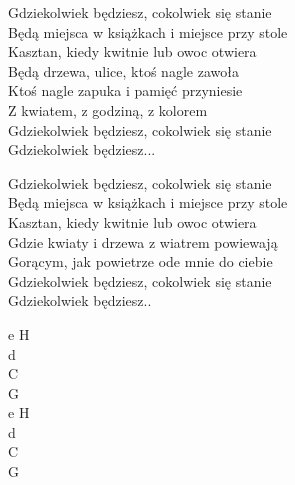 \begin{text}
    Gdziekolwiek będziesz, cokolwiek się stanie\\
    Będą miejsca w książkach i miejsce przy stole\\
    Kasztan, kiedy kwitnie lub owoc otwiera\\
    Będą drzewa, ulice, ktoś nagle zawoła\\
    Ktoś nagle zapuka i pamięć przyniesie\\
    Z kwiatem, z godziną, z kolorem\\
    Gdziekolwiek będziesz, cokolwiek się stanie\\
    Gdziekolwiek będziesz...

    Gdziekolwiek będziesz, cokolwiek się stanie\\
    Będą miejsca w książkach i miejsce przy stole\\
    Kasztan, kiedy kwitnie lub owoc otwiera\\
    Gdzie kwiaty i drzewa z wiatrem powiewają\\
    Gorącym, jak powietrze ode mnie do ciebie\\
    Gdziekolwiek będziesz, cokolwiek się stanie\\
    Gdziekolwiek będziesz..
\end{text}
\begin{chord}
    e H\\
    d\\
    C\\
    G\\
    e H\\
    d\\
    C\\
    G
\end{chord}